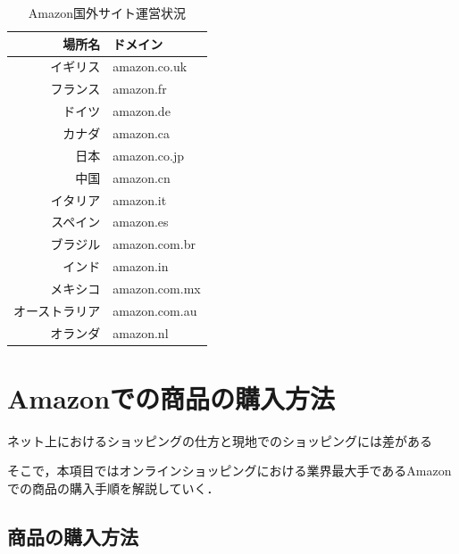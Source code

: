 \begin{table}[htb]
\label{Amazon国外サイト運営状況}
  \begin{center}
    \caption{Amazon国外サイト運営状況}


\begin{tabular}{|r|p{15em}|}

	\hline
	場所名 & ドメイン  \\
	\hline
	イギリス & amazon.co.uk  \\
	\hline
	フランス & amazon.fr  \\
	\hline
	ドイツ & amazon.de  \\
	\hline
	カナダ & amazon.ca  \\
	\hline
	日本 & amazon.co.jp  \\
	\hline
	中国 & amazon.cn  \\
	\hline
	イタリア & amazon.it  \\
	\hline
	スペイン & amazon.es  \\
	\hline
	ブラジル & amazon.com.br  \\
	\hline
	インド & amazon.in  \\
	\hline
	メキシコ & amazon.com.mx  \\
	\hline
	オーストラリア & amazon.com.au  \\
	\hline
	オランダ & amazon.nl  \\
	\hline
    \end{tabular}
  \end{center}
\end{table}








\newpage









\section{Amazonでの商品の購入方法}

ネット上におけるショッピングの仕方と現地でのショッピングには差がある

そこで，本項目ではオンラインショッピングにおける業界最大手であるAmazonでの商品の購入手順を解説していく．

\subsection{商品の購入方法}

